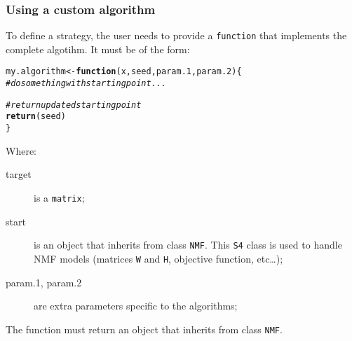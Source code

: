 \documentclass[a4paper]{article}\usepackage[]{graphicx}\usepackage[]{color}
\makeatletter
\newcommand{\hlcom}[1]{\textcolor[rgb]{0.678,0.584,0.686}{\textit{#1}}}%
\newcommand{\hlstd}[1]{\textcolor[rgb]{0.345,0.345,0.345}{#1}}%
\newcommand{\hlkwa}[1]{\textcolor[rgb]{0.161,0.373,0.58}{\textbf{#1}}}%
\newcommand{\hlkwb}[1]{\textcolor[rgb]{0.69,0.353,0.396}{#1}}%
\newcommand{\hlkwc}[1]{\textcolor[rgb]{0.333,0.667,0.333}{#1}}%
\newcommand{\hlkwd}[1]{\textcolor[rgb]{0.737,0.353,0.396}{\textbf{#1}}}%
\newenvironment{kframe}{%
 \def\at@end@of@kframe{}%
 \ifinner\ifhmode%
  \def\at@end@of@kframe{\end{minipage}}%
  \begin{minipage}{\columnwidth}%
 \fi\fi%
 \def\FrameCommand##1{\hskip\@totalleftmargin \hskip-\fboxsep
 \colorbox{shadecolor}{##1}\hskip-\fboxsep
     \hskip-\linewidth \hskip-\@totalleftmargin \hskip\columnwidth}%
 \MakeFramed {\advance\hsize-\width
   \@totalleftmargin\z@ \linewidth\hsize
   \@setminipage}}%
 {\par\unskip\endMakeFramed%
 \at@end@of@kframe}
\newenvironment{knitrout}{}{} %
\let\code=\texttt
\makeatother
\begin{document}
\subsubsection{Using a custom algorithm}\label{sec:algo_custom}
To define a strategy, the user needs to provide a \code{function} that implements the complete algotihm. It must be of the form: 

\begin{knitrout}
\color{fgcolor}\begin{kframe}
\begin{alltt}
\hlstd{my.algorithm} \hlkwb{<-} \hlkwa{function}\hlstd{(}\hlkwc{x}\hlstd{,} \hlkwc{seed}\hlstd{,} \hlkwc{param.1}\hlstd{,} \hlkwc{param.2}\hlstd{) \{}
    \hlcom{# do something with starting point ...}

    \hlcom{# return updated starting point}
    \hlkwd{return}\hlstd{(seed)}
\hlstd{\}}
\end{alltt}
\end{kframe}
\end{knitrout}

Where:

\begin{description}
\item[target] is a \code{matrix}; 
\item[start] is an object that inherits from class \code{NMF}. 
This \code{S4} class is used to handle NMF models (matrices \code{W} and \code{H}, objective function, etc\dots);
\item[param.1, param.2] are extra parameters specific to the algorithms;
\end{description}

The function must return an object that inherits from class \code{NMF}.
\end{document}
